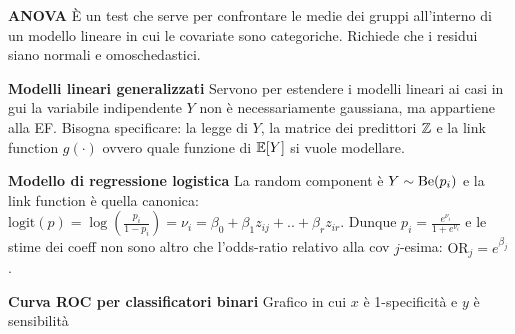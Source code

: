 \smallskip

\textbf{ANOVA} È un test che serve per confrontare le medie dei gruppi all'interno di un modello lineare in cui le covariate sono categoriche. Richiede che i residui siano normali e omoschedastici.

\smallskip

\textbf{Modelli lineari generalizzati} Servono per estendere i modelli lineari ai casi in gui la variabile indipendente $Y$ non è necessariamente gaussiana, ma appartiene alla EF. Bisogna specificare: la legge di $Y$, la matrice dei predittori $\mathbb{Z}$ e la link function $g(\cdot)$ ovvero quale funzione di $\mathbb{E}[Y]$ si vuole modellare.

\smallskip

\textbf{Modello di regressione logistica} La random component è $Y\sim\operatorname{Be}(p_i)$ e la link function è quella canonica: $\text{logit}(p)=\log\left(\frac{p_i}{1-p_i}\right)=\nu_i=\beta_0+\beta_1z_{ij}+..+\beta_rz_{ir}$. Dunque $p_i=\frac{e^{\nu_i}}{1+e^{\nu_i}}$ e le stime dei coeff non sono altro che l'odds-ratio relativo alla cov $j$-esima: $\text{OR}_j=e^{\beta_j}$.

\smallskip

\textbf{Curva ROC per classificatori binari} Grafico in cui $x$ è 1-specificità e $y$ è sensibilità












